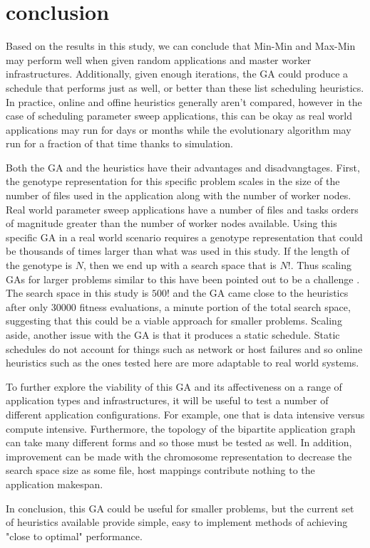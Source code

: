 \section{conclusion}
\label{sec:conclusion}
Based on the results in this study, we can conclude that Min-Min and Max-Min
may perform well when given random applications and master worker
infrastructures. Additionally, given enough iterations, the GA could
produce a schedule that performs just as well, or better than these
list scheduling heuristics. In practice, online and offine heuristics
generally aren't compared, however in the case of scheduling parameter
sweep applications, this can be okay as real world applications may run
for days or months while the evolutionary algorithm may run for a fraction
of that time thanks to simulation.

Both the GA and the heuristics have their advantages and disadvangtages. First,
the genotype representation for this specific problem scales in the size of
the number of files used in the application along with the number of worker
nodes. Real world parameter sweep applications have a number of files and tasks
orders of magnitude greater than the number of worker nodes available. Using
this specific GA in a real world scenario requires a genotype representation
that could be thousands of times larger than what was used in this study.
If the length of the genotype is $N$, then we end up with a search space
that is $N!$. Thus scaling GAs for larger problems similar to this have
been pointed out to be a challenge \cite{wu-incremental-genetic-04}. The search
space in this study is $500!$ and the GA came close to the heuristics after
only 30000 fitness evaluations, a minute portion of the total search space,
suggesting that this could be a viable approach for smaller problems. Scaling
aside, another issue with the GA is that it produces a static schedule. Static
schedules do not account for things such as network or host failures and so
online heuristics such as the ones tested here are more adaptable to real
world systems.

To further explore the viability of this GA and its affectiveness on a range
of application types and infrastructures, it will be useful to test a number
of different application configurations. For example, one that is data intensive
versus compute intensive. Furthermore, the topology of the bipartite application
graph can take many different forms and so those must be tested as well.
In addition, improvement can be made with the chromosome representation
to decrease the search space size as some file, host mappings contribute
nothing to the application makespan.

In conclusion, this GA could be useful for smaller problems, but the
current set of heuristics available provide simple, easy to implement
methods of achieving "close to optimal" performance.
